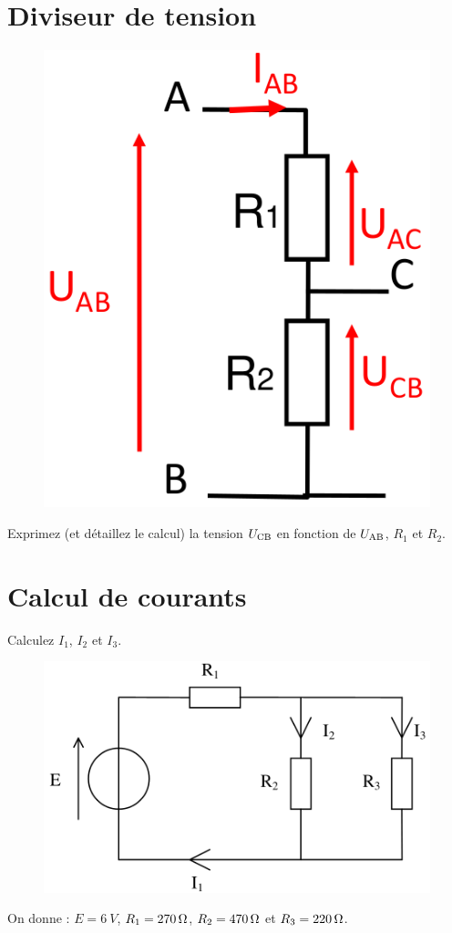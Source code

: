 \documentclass[10pt,a4paper]{article}
\begin{document}
\newpage

\section{Diviseur de tension}
\begin{figure}
    \centering
    \includegraphics[width=\linewidth]{DivTen.png}
    \captionsetup{justification=centering}
\end{figure}
Exprimez (et détaillez le calcul) la tension $U_{\text{CB}}$ en fonction de
$U_{\text{AB}}$, $R_1$ et $R_2$.

\vfill

\section{Calcul de courants}
Calculez $I_1$, $I_2$ et $I_3$.
\begin{figure}[htbp!]
    \centering
    \includegraphics[width=.4\linewidth]{Courants.png}
    \captionsetup{justification=centering}
\end{figure}

On donne : $E = \SI{6}{V}$, $R_1 = \SI{270}{\Omega}$, $R_2 = \SI{470}{\Omega}$ et $R_3 =
\SI{220}{\Omega}$.

\vspace{12cm}
\end{document}
